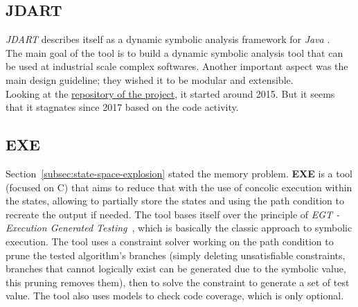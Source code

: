 \documentclass[11pt]{IEEEtran}
\begin{document}
	\subsection{JDART}
		\emph{JDART} describes itself as a dynamic symbolic analysis framework for \emph{Java} \cite{jDart}.\\
		The main goal of the tool is to build a dynamic symbolic analysis tool that can be used at industrial scale complex softwares. Another important aspect was the main design guideline; they wished it to be modular and extensible.\\


		Looking at the \href{https://github.com/psycopaths/jdart}{repository of the project}, it started around 2015. But it seems that it stagnates since 2017 based on the code activity.


  \subsection{EXE}
    \label{subsec:exe}
    Section~\ref{subsec:state-space-explosion} stated the memory problem. \textbf{EXE} is a tool (focused on C) that aims to reduce that with the use of concolic execution within the states, allowing to partially store the states and using the path condition to recreate the output if needed. The tool bases itself over the principle of \emph{EGT - Execution Generated Testing}~\cite{exe}, which is basically the classic approach to symbolic execution. The tool uses a constraint solver working on the path condition to prune the tested algorithm's branches (simply deleting unsatisfiable constraints, branches that cannot logically exist can be generated due to the symbolic value, this pruning removes them), then to solve the constraint to generate a set of test value. The tool also uses models to check code coverage, which is only optional.
\end{document}
